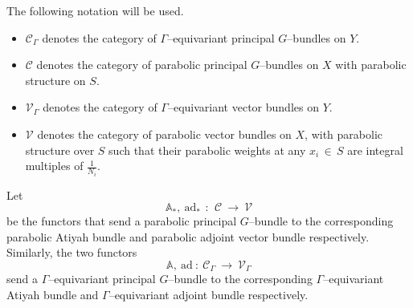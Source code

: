 \documentclass[12pt, reqno]{amsart}
\numberwithin{equation}{section}
\newcommand{\ad}{\textrm{ad}}
\begin{document}
The following notation will be used.
\begin{itemize}
\item $\mathscr{C}_{\Gamma}$ denotes the category of $\Gamma$--equivariant principal $G$--bundles on $Y$.

\item $\mathscr{C}$ denotes the category of parabolic principal $G$--bundles on $X$ with parabolic
structure on $S$.

\item $\mathscr{V}_{\Gamma}$ denotes the category of $\Gamma$--equivariant vector bundles on $Y$.

\item $\mathscr{V}$ denotes the category of parabolic vector bundles on $X$, with parabolic
structure over $S$ such that their parabolic weights at any $x_{i}\, \in\, S$ are
integral multiples of $\frac{1}{N_{i}}$. 
\end{itemize}

Let
$$\mathbb{A}_{*},\ \ad_{*}\,\ :\, \ \mathscr{C}\ \longrightarrow\ \mathscr{V}$$
be the functors that send a parabolic principal $G$--bundle to the corresponding parabolic Atiyah bundle and
parabolic adjoint vector bundle respectively. Similarly, the two functors
$$\mathbb{A},\ \ad\ :\ \mathscr{C}_{\Gamma}\ \longrightarrow\ \mathscr{V}_{\Gamma}$$
send a $\Gamma$--equivariant principal $G$--bundle to the corresponding
$\Gamma$--equivariant Atiyah bundle and $\Gamma$--equivariant adjoint bundle respectively.
\end{document}

